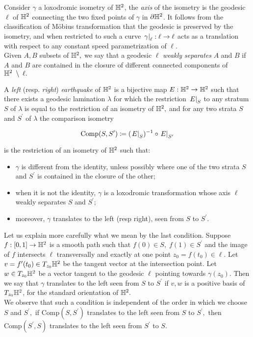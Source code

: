 \noindent Consider $\gamma$ a loxodromic isometry of $\mathbb{H}^2$, the \textit{axis} of the isometry is the geodesic $\ell$ of $\mathbb{H}^2$ connecting the two fixed points of $\gamma$ in $\partial\mathbb{H}^2$. It follows from the classification of Möbius transformation that the geodesic is preserved by the isometry, and when restricted to such a curve $\left.\gamma\right|_{\ell}:\ell\to\ell$ acts as a translation with respect to any constant speed parametrization of $\ell$.\\
Given $A,B$ subsets of $\mathbb{H}^2,$ we say that a geodesic $\ell$ \textit{weakly separates} $A$ and $B$ if $A$ and $B$ are contained in the closure of different connected components of $\mathbb{H}^2\;\setminus\;\ell.$ 

\begin{definition}
    A \textit{left} (resp. \textit{right}) \textit{earthquake} of $\mathbb{H}^2$ is a bijective map $E:\mathbb{H}^2\to\mathbb{H}^2$ such that there exists a geodesic lamination $\lambda$ for which the restriction $\left.E\right|_{S}$ to any stratum $S$ of $\lambda$ is equal to the restriction of an isometry of $\mathbb{H}^2,$ and for any two strata $S$ and $S^{\prime}$ of $\lambda$ the comparison isometry 
    
    \[
        \text{Comp}(S,S^{\prime})\coloneqq (\left.E\right|_{S})^{-1}\circ \left.E\right|_{S^{\prime} }
    \]

    is the restriction of an isometry of $\mathbb{H}^2$ such that:
    \begin{itemize}
        \item $\gamma$ is different from the identity, unless possibly where one of the two strata $S$ and $S^{\prime}$ is contained in the closure of the other;
        \item when it is not the identity, $\gamma$ is a loxodromic transformation whose axis $\ell$ weakly separates $S$ and $S^{\prime};$
        \item moreover, $\gamma$ translates to the left (resp right), seen from $S$ to $S^{\prime}$. 
    \end{itemize}
\end{definition}

Let us explain more carefully what we mean by the last condition. Suppose $f:[0,1]\to\mathbb{H}^2$ is a smooth path such that $f(0)\in S,\;f(1)\in S^{\prime}$ and the image of $f$ intersects $\ell$ transversally and exactly at one point $z_0=f(t_0)\in\ell.$ Let $v=f^{\prime}(t_0)\in T_{z_0}\mathbb{H}^2$ be the tangent vector at the intersection point. Let $w\in T_{z_0}\mathbb{H}^2$ be a vector tangent to the geodesic $\ell$ pointing towards $\gamma(z_0).$ Then we say that $\gamma$ translates to the left seen from $S$ to $S^{\prime} $ if $v,w$ is a positive basis of $T_{z_0}\mathbb{H}^2$, for the standard orientation of $\mathbb{H}^2.$\\
We observe that such a condition is independent of the order in which we choose $S$ and $S^{\prime},$  if $\text{Comp}(S,S^{\prime})$ translates to the left seen from $S$ to $S^{\prime},$ then $\text{Comp}(S^{\prime} ,S)$ translates to the left seen from $S^{\prime} $ to $S.$ 

